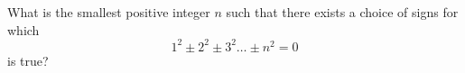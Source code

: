 What is the smallest positive integer $n$ such that there exists a choice of signs for which \[1^2\pm2^2\pm3^2\ldots\pm n^2=0\] is true?